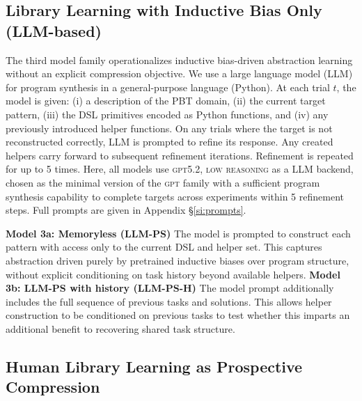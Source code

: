 \documentclass{article}
\begin{document}
\subsection{Library Learning with Inductive Bias Only (LLM-based)}

The third model family operationalizes inductive bias-driven abstraction learning without an explicit compression objective. We use a large language model (LLM) for program synthesis in a general-purpose language (Python). At each trial $t$, the model is given:
(i) a description of the PBT domain,
(ii) the current target pattern,
(iii) the DSL primitives encoded as Python functions, and
(iv) any previously introduced helper functions. On any trials where the target is not reconstructed correctly, LLM is prompted to refine its response. Any created helpers carry forward to subsequent refinement iterations. Refinement is repeated for up to 5 times.
Here, all models use \textsc{gpt5.2, low reasoning} as a LLM backend, chosen as the minimal version of the \textsc{gpt} family with a sufficient program synthesis capability to complete targets across experiments within 5 refinement steps. Full prompts are given in Appendix \S\ref{si:prompts}.

\textbf{Model 3a: Memoryless (LLM-PS)}
The model is prompted to construct each pattern with access only to the current DSL and helper set. This captures abstraction driven purely by pretrained inductive biases over program structure, without explicit conditioning on task history beyond available helpers.
\textbf{Model 3b: LLM-PS with history (LLM-PS-H)}
The model prompt additionally includes the full sequence of previous tasks and solutions. This allows helper construction to be conditioned on previous tasks to test whether this imparts an additional benefit to recovering shared task structure.

\subsection{Human Library Learning as Prospective Compression}
\end{document}
